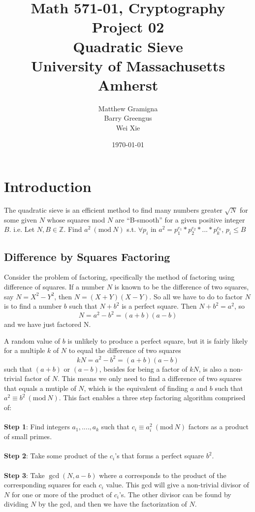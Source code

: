 \documentclass[titlepage]{article}
\title{Math 571-01, Cryptography Project 02 \\ Quadratic Sieve \\ University of Massachusetts Amherst}
\author{Matthew Gramigna \\ Barry Greengus \\  Wei Xie}
\date{\today}
\newcommand{\Mod}[1]{\ (\text{mod}\ #1)}
\begin{document}
	
	\maketitle
	
	\section{Introduction}
	The quadratic sieve is an efficient method to find many numbers greater $\sqrt{N}$ for some given $N$ whose squares mod $N$ are ``B-smooth'' for a given positive integer $B$. i.e. Let $N,B\in{\mathbb{Z}}$. Find $a^2 \Mod{N}$ s.t. $\forall p_i $ in $a^2 = p^{e_1}_1*p^{e_2}_2*...*p^{e_k}_k$, $p_i \leq B$\\
	
	\subsection{Difference by Squares Factoring}
	Consider the problem of factoring, specifically the method of factoring using difference of squares. If a number $N$ is known to be the difference of two squares, say $N = X^2 - Y^2$, then $N = (X+Y) (X-Y)$. So all we have to do to factor $N$ is to find a number $b$ such that $N + b^2$ is a perfect square. Then $N + b^2 = a^2$, so \[N = a^2 - b^2 = (a+b)(a-b)\] and we have just factored N.
	
	A random value of $b$ is unlikely to produce a perfect square, but it is fairly likely for a multiple $k$ of $N$ to equal the difference of two squares \[kN = a^2 - b^2 = (a+b)(a-b)\] such that $(a+b)$ or $(a-b)$, besides for being a factor of $kN$, is also a non-trivial factor of $N$. This means we only need to find a difference of two squares that equals a mutiple of $N$, which is the equivalent of finding $a$ and $b$ such that $a^2\equiv b^2 \Mod{N}$. This fact enables a three step factoring algorithm comprised of:\\\\
	\textbf{Step 1}: Find integers $a_1, ...., a_k$ such that $c_i \equiv a_i^2 \Mod{N}$ factors as a product of small primes. \\\\
	\textbf{Step 2}: Take some product of the $c_i$'s that forms a perfect square $b^2$.  \\\\
	\textbf{Step 3}: Take $\gcd(N,a-b)$ where $a$ corresponds to the product of the corresponding squares for each $c_i$ value. This gcd will give a non-trivial divisor of $N$ for one or more of the product of $c_i$'s. The other divisor can be found by dividing $N$ by the gcd, and then we have the factorization of $N$. \\
	
\end{document}
